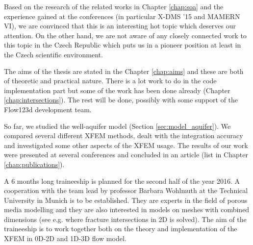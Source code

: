 \documentclass[bibliography=totocnumbered,dvipsnames,FM,Dis]{tulthesis}
\begin{document}
Based on the research of the related works in Chapter \ref{chap:soa} and the experience gained at the conferences
(in particular X-DMS '15 and MAMERN VI), we are convinced that this is an interesting hot topic which deserves
our attention. On the other hand, we are not aware of any closely connected work to this topic in the Czech Republic
which puts us in a pioneer position at least in the Czech scientific environment.

The aims of the thesis are stated in the Chapter \ref{chap:aims} and these are both of theoretic and practical nature.
There is a lot work to do in the code implementation part but some of the work has been done already 
(Chapter \ref{chap:intersections}). The rest will be done, possibly with some support of the Flow123d development team. 

So far, we studied the well-aquifer model (Section \ref{sec:model_aquifer}). We compared several different XFEM methods, 
dealt with the integration accuracy and investigated some other aspects of the XFEM usage. The results
of our work were presented at several conferences and concluded in an article (list in Chapter \ref{chap:publications}).

A 6 months long traineeship is planned for the second half of the year 2016. A cooperation with the team lead
by professor Barbara Wohlmuth at the Technical University in Munich is to be established. They are experts
in the field of porous media modelling and they are also interested in models on meshes with combined dimensions
(see e.g. \cite{schwenck_2015} where fracture intersections in 2D is solved). The aim of the traineeship is to
work together both on the theory and implementation of the XFEM in 0D-2D and 1D-3D flow model.



{\small

% 

}
\end{document}
